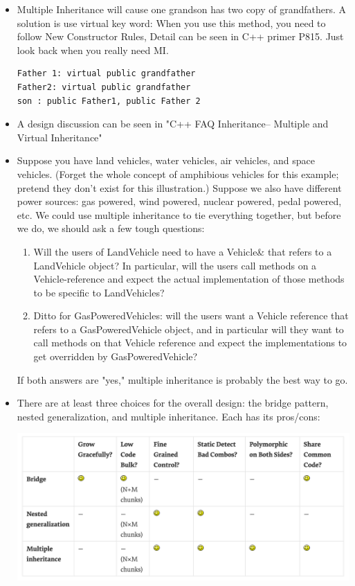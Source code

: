 \documentclass[a4paper,11pt,twoside]{book}
\begin{document}
\begin{itemize}
	\item Multiple Inheritance will cause one grandson has two copy of grandfathers. A solution is use virtual key word: When you use this method, you need to follow New Constructor Rules, Detail can be seen in C++ primer P815.  Just look back when you really need MI.
\begin{lstlisting}[numbers=none]
Father 1: virtual public grandfather
Father2: virtual public grandfather
son : public Father1, public Father 2
\end{lstlisting}
	
	\item A design discussion can be seen in "C++ FAQ Inheritance-- Multiple and Virtual Inheritance"
	\item Suppose you have land vehicles, water vehicles, air vehicles, and space vehicles. (Forget the whole concept of amphibious vehicles for this example; pretend they don't exist for this illustration.) Suppose we also have different power sources: gas powered, wind powered, nuclear powered, pedal powered, etc. We could use multiple inheritance to tie everything together, but before we do, we should ask a few tough questions:
	
	\begin{enumerate}
		\item Will the users of LandVehicle need to have a Vehicle\& that refers to a LandVehicle object? In particular, will the users call methods on a Vehicle-reference and expect the actual implementation of those methods to be specific to LandVehicles?
		
		\item Ditto for GasPoweredVehicles: will the users want a Vehicle reference that refers to a GasPoweredVehicle object, and in particular will they want to call methods on that Vehicle reference and expect the implementations to get overridden by GasPoweredVehicle?
	\end{enumerate}
	If both answers are "yes," multiple inheritance is probably the best way to go.
	
	\item There are at least three choices for the overall design: the bridge pattern, nested generalization, and multiple inheritance. Each has its pros/cons:
	
	\includegraphics[scale=0.4]{pics/MI.png}
	

\end{itemize}
\end{document}
